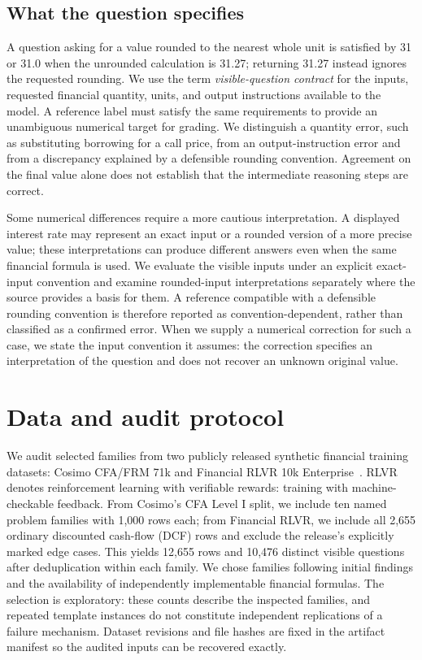 \FloatBarrier
{}
\begin{samepage}
\section{What the question specifies}
A question asking for a value rounded to the nearest whole unit is satisfied by 31 or 31.0 when the unrounded calculation is 31.27; returning 31.27 instead ignores the requested rounding. We use the term \emph{visible-question contract} for the inputs, requested financial quantity, units, and output instructions available to the model. A reference label must satisfy the same requirements to provide an unambiguous numerical target for grading. We distinguish a quantity error, such as substituting borrowing for a call price, from an output-instruction error and from a discrepancy explained by a defensible rounding convention. Agreement on the final value alone does not establish that the intermediate reasoning steps are correct.

Some numerical differences require a more cautious interpretation. A displayed interest rate may represent an exact input or a rounded version of a more precise value; these interpretations can produce different answers even when the same financial formula is used. We evaluate the visible inputs under an explicit exact-input convention and examine rounded-input interpretations separately where the source provides a basis for them. A reference compatible with a defensible rounding convention is therefore reported as convention-dependent, rather than classified as a confirmed error. When we supply a numerical correction for such a case, we state the input convention it assumes: the correction specifies an interpretation of the question and does not recover an unknown original value.

\end{samepage}

\section{Data and audit protocol}
We audit selected families from two publicly released synthetic financial training datasets: Cosimo CFA/FRM 71k and Financial RLVR 10k Enterprise~\cite{cosimo,rlvr}. RLVR denotes reinforcement learning with verifiable rewards: training with machine-checkable feedback. From Cosimo's CFA Level I split, we include ten named problem families with 1,000 rows each; from Financial RLVR, we include all 2,655 ordinary discounted cash-flow (DCF) rows and exclude the release's explicitly marked edge cases. This yields 12,655 rows and 10,476 distinct visible questions after deduplication within each family. We chose families following initial findings and the availability of independently implementable financial formulas. The selection is exploratory: these counts describe the inspected families, and repeated template instances do not constitute independent replications of a failure mechanism. Dataset revisions and file hashes are fixed in the artifact manifest so the audited inputs can be recovered exactly.

